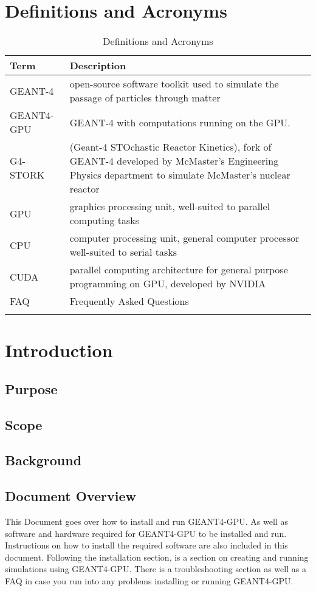 \documentclass[12pt]{article}
\begin{document}
\section{Definitions and Acronyms} %
\begin{table}[h]
\centering
\caption{Definitions and Acronyms}
\begin{tabularx}{\textwidth}{l|X}
\Xhline{2\arrayrulewidth}
\bf Term & \bf Description\\
\hline
GEANT-4 & open-source software toolkit used to simulate the passage of particles through matter\\\hline
GEANT4-GPU & GEANT-4 with computations running on the GPU.\\\hline
G4-STORK & (Geant-4 STOchastic Reactor Kinetics), fork of GEANT-4 developed by McMaster's Engineering Physics department to simulate McMaster's nuclear reactor\\\hline
GPU & graphics processing unit, well-suited to parallel computing tasks\\\hline
CPU & computer processing unit, general computer processor well-suited to serial tasks\\\hline
CUDA & parallel computing architecture for general purpose programming on GPU, developed by NVIDIA\\\hline
FAQ & Frequently Asked Questions \\\hline
\Xhline{2\arrayrulewidth}
\end{tabularx}
\end{table}



\section{Introduction} %
\subsection{Purpose} %
\subsection{Scope} %
\subsection{Background} %
\subsection{Document Overview} %
This Document goes over how to install and run GEANT4-GPU. As well as software and hardware required for GEANT4-GPU to be installed and run. Instructions on how to install the required software 
are also included in this document. Following the installation section, is a section on creating and running simulations using GEANT4-GPU.  There is a troubleshooting section as well as a FAQ 
in case you run into any problems installing or running GEANT4-GPU.
\end{document}
